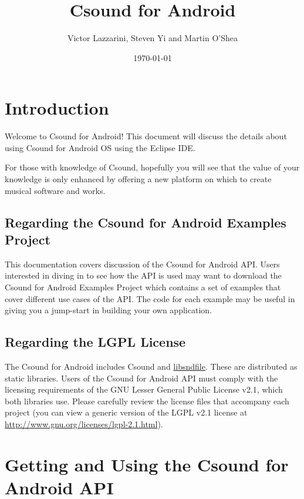 \documentclass[11pt]{article}
\author{Victor Lazzarini, Steven Yi and Martin O'Shea}
\date{\today}
\title{Csound for Android}
\begin{document}
\maketitle

\section{Introduction}

Welcome to Csound for Android! This document will discuss the details about using Csound for Android OS using the Eclipse IDE.  

For those with knowledge of Csound, hopefully you will see that the value of your knowledge is only enhanced by offering a new platform on which to create musical software and works. 

\subsection{Regarding the Csound for Android Examples Project}

This documentation covers discussion of the Csound for Android API.  Users interested in diving in to see how the API is used may want to download the Csound for Android Examples Project which contains a set of examples that cover different use cases of the API. The code for each example may be useful in giving you a jump-start in building your own application.

\subsection{Regarding the LGPL License}

The Csound for Android includes Csound and \href{http://mega-nerd.com/libsndfile/}{libsndfile}. These are distributed as static libraries. Users of the Csound for Android API must comply with the licensing requirements of the GNU Lesser General Public License v2.1, which both libraries use. Please carefully review the license files that accompany each project (you can view a generic version of the LGPL v2.1 license at \href{http://www.gnu.org/licenses/lgpl-2.1.html}{http://www.gnu.org/licenses/lgpl-2.1.html}). 


\section{Getting and Using the Csound for Android API}
\end{document}
